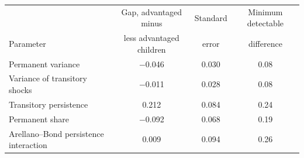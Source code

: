 \begin{tabular}{@{}lccc@{}}
\toprule
 & Gap, advantaged minus & Standard & Minimum detectable \\
Parameter & less advantaged children & error & difference \\
\midrule
Permanent variance & $-$0.046 & 0.030 & 0.08 \\
Variance of transitory shocks & $-$0.011 & 0.028 & 0.08 \\
Transitory persistence & 0.212 & 0.084 & 0.24 \\
Permanent share & $-$0.092 & 0.068 & 0.19 \\
Arellano--Bond persistence interaction & 0.009 & 0.094 & 0.26 \\
\bottomrule
\end{tabular}
